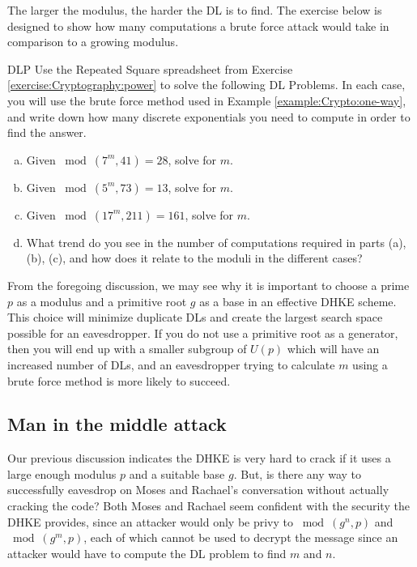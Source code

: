 The larger the modulus, the harder the DL is to find. The exercise below is designed to show how many computations a brute force attack would take in comparison to a growing modulus.

\begin{exercise}{DLP}
Use the Repeated Square spreadsheet from Exercise \ref{exercise:Cryptography:power} to solve the following DL Problems. In each case, you will use the brute force method used in Example \ref{example:Crypto:one-way}, and write down how many discrete exponentials you need to compute in order to find the answer.  
\begin{enumerate}[(a)]
\item Given $ \bmod(7^{m}, 41)=28$, solve for $m$.

\item Given $ \bmod(5^{m}, 73)=13$, solve for $m$.

\item Given $ \bmod(17^{m}, 211)=161$, solve for $m$.

\item
What trend do you see in the number of computations required in parts (a), (b), (c), and how does it relate to the moduli in the different cases?
\end{enumerate}
\end{exercise}

From the foregoing discussion, we may see why it is important to choose a prime $p$ as a modulus and a primitive root $g$ as a base in an effective DHKE scheme. This choice will minimize duplicate DLs and create the largest search space possible for an eavesdropper.  If you do not use a primitive root as a generator, then you will end up with a smaller subgroup of $U(p)$ which will have an increased number of DLs, and an eavesdropper trying to calculate $m$ using a brute force method is more likely to succeed. 

\subsection{Man in the middle attack}
Our previous discussion indicates the DHKE is very hard to crack if it uses a large enough modulus $p$ and a suitable base $g$. But, is there any way to successfully eavesdrop on Moses and Rachael's conversation without actually cracking the code?  Both Moses and Rachael seem confident with the security the DHKE provides, since an attacker would only be privy to $\bmod (g^n , p)$ and $\bmod (g^m , p)$, each of which cannot be used to decrypt the message since an attacker would have to compute the DL problem to find $m$ and $n$. 

